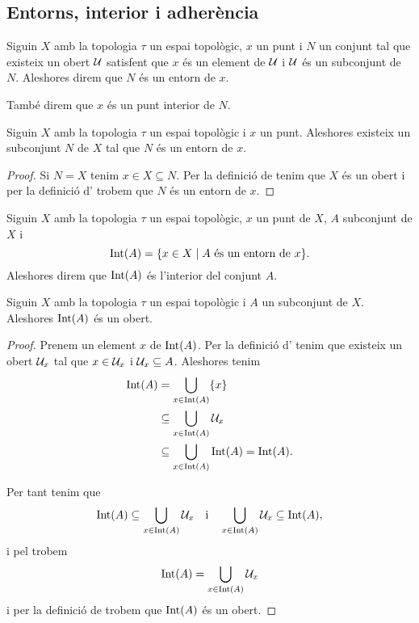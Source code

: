 \documentclass[../Apunts.tex]{subfiles}
\begin{document}
	\subsection{Entorns, interior i adherència}
	\begin{definition}[Entorn]
		\label{def:entorn}
		\label{def:punt interior}
		Siguin \(X\) amb la topologia \(\tau\) un espai topològic, \(x\) un punt i \(N\) un conjunt tal que existeix un obert \(\mathcal{U}\) satisfent que \(x\) és un element de \(\mathcal{U}\) i \(\mathcal{U}\) és un subconjunt de \(N\). Aleshores direm que \(N\) és un entorn de \(x\).
		
		També direm que \(x\) és un punt interior de \(N\).
	\end{definition}
	\begin{observation}
		\label{obs:tot punt té un entorn}
		Siguin \(X\) amb la topologia \(\tau\) un espai topològic i \(x\) un punt. Aleshores existeix un subconjunt \(N\) de \(X\) tal que \(N\) és un entorn de \(x\).
		\begin{proof}
			Si \(N=X\) tenim \(x\in X\subseteq N\). Per la definició de  tenim que \(X\) és un obert i per la definició d' trobem que \(N\) és un entorn de \(x\).
		\end{proof}
	\end{observation}
	\begin{definition}[Interior]
		\label{def:interior}
		Siguin \(X\) amb la topologia \(\tau\) un espai topològic, \(x\) un punt de \(X\), \(A\) subconjunt de \(X\) i
		\[\operatorname{Int}(A)=\{x\in X\mid A\text{ és un entorn de }x\}.\]
		Aleshores direm que \(\operatorname{Int}(A)\) és l'interior del conjunt \(A\).
	\end{definition}
	\begin{proposition}
		\label{prop:l'interior d'un conjunt és un obert}
		Siguin \(X\) amb la topologia \(\tau\) un espai topològic i \(A\) un subconjunt de \(X\). Aleshores \(\operatorname{Int}(A)\) és un obert.
		\begin{proof}
			Prenem un element \(x\) de \(\operatorname{Int}(A)\). Per la definició d' tenim que existeix un obert \(\mathcal{U}_{x}\) tal que \(x\in\mathcal{U}_{x}\) i \(\mathcal{U}_{x}\subseteq A\). Aleshores tenim
			\begin{align*}
				\operatorname{Int}(A)&=\bigcup_{x\in\operatorname{Int}(A)}\{x\} \\
				&\subseteq\bigcup_{x\in\operatorname{Int}(A)}\mathcal{U}_{x} \\
				&\subseteq\bigcup_{x\in\operatorname{Int}(A)}\operatorname{Int}(A)=\operatorname{Int}(A).
			\end{align*}
			
			Per tant tenim que
			\[\operatorname{Int}(A)\subseteq\bigcup_{x\in\operatorname{Int}(A)}\mathcal{U}_{x}\quad\text{i}\quad\bigcup_{x\in\operatorname{Int}(A)}\mathcal{U}_{x}\subseteq\operatorname{Int}(A),\]
			i pel  trobem
			\[\operatorname{Int}(A)=\bigcup_{x\in\operatorname{Int}(A)}\mathcal{U}_{x}\]
			i per la definició de  trobem que \(\operatorname{Int}(A)\) és un obert.
		\end{proof}
	\end{proposition}
\end{document}
